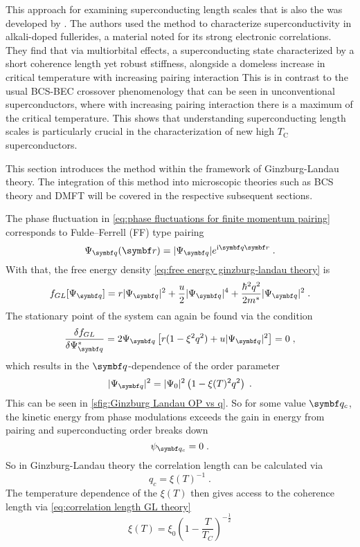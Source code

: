 \documentclass[../notes.tex]{subfiles}
\begin{document}
This approach for examining superconducting length scales that is also the  was developed by \citeauthor{wittBypassingLatticeBCS2024} \cite{wittBypassingLatticeBCS2024}.
The authors used the method to characterize superconductivity in alkali-doped fullerides, a material noted for its strong electronic correlations.
They find that via multiorbital effects, a superconducting state characterized by a short coherence length yet robust stiffness, alongside a domeless increase in critical temperature with increasing pairing interaction
This is in contrast to the usual BCS-BEC crossover phenomenology that can be seen in unconventional superconductors, where with increasing pairing interaction there is a maximum of the critical temperature.
This shows that understanding superconducting length scales is particularly crucial in the characterization of new high \(T_{\mathrm{C}}\) superconductors.

This section introduces the method within the framework of Ginzburg-Landau theory.
The integration of this method into microscopic theories such as BCS theory and DMFT will be covered in the respective subsequent sections.

The phase fluctuation in \cref{eq:phase fluctuations for finite momentum pairing} corresponds to Fulde–Ferrell (FF) type pairing \cite{kinnunenFuldeFerrellLarkin2018}
\begin{equation}
	\Psi_{\vb{q}} (\vb{r}) = \vert \Psi_{\vb{q}} \vert e^{\iu \vb{q} \vb{r}} \;.
\end{equation}
With that, the free energy density \cref{eq:free energy ginzburg-landau theory} is
\begin{equation}
	f_{GL} [\Psi_{\vb{q}}] = r \vert \Psi_{\vb{q}} \vert^2 + \frac{u}{2} \vert \Psi_{\vb{q}} \vert^4 + \frac{\hbar^2 q^2}{2 m^*} \vert \Psi_{\vb{q}} \vert^2 \;.
\end{equation}
The stationary point of the system can again be found via the condition
\begin{equation}
	\fdv{f_{GL}}{\Psi_{\vb{q}}^*} = 2 \Psi_{\vb{q}} \left[r (1 - \xi^2 q^2) + u \vert \Psi_{\vb{q}} \vert^2\right] = 0 \;,
\end{equation}
which results in the \(\vb{q}\)-dependence of the order parameter
\begin{equation}
	\vert \Psi_{\vb{q}} \vert^2 = \vert \Psi_{0} \vert^2 \left(1 - \xi(T)^2 q^2\right) \;.
\end{equation}
This can be seen in \cref{sfig:Ginzburg Landau OP vs q}.
So for some value \(\vb{q}_c\), the kinetic energy from phase modulations exceeds the gain in energy from pairing and superconducting order breaks down
\begin{equation}
	\psi_{\vb{q}_c} = 0 \;.
\end{equation}
So in Ginzburg-Landau theory the correlation length can be calculated via
\begin{equation}
	q_c = \xi(T)^{-1} \;.
\end{equation}
The temperature dependence of the \(\xi(T)\) then gives access to the coherence length via \cref{eq:correlation length GL theory}
\begin{equation}
	\xi(T) = \xi_0 \left(1 - \frac{T}{T_C}\right)^{-\frac{1}{2}}
\end{equation}
\end{document}
